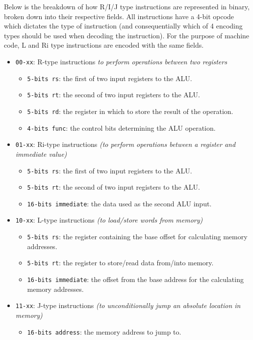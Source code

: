 \label{sec:MachineCodeEncoding}

Below is the breakdown of how R/I/J type instructions are represented in binary, broken down into their respective fields. All instructions have a 4-bit opcode which dictates the type of instruction (and consequentially which of 4 encoding types should be used when decoding the instruction). For the purpose of machine code, L and Ri type instructions are encoded with the same fields.

\begin{itemize}
    \item \texttt{00-xx}: R-type instructions \textit{to perform operations between two registers}
        \begin{itemize}
            \item \texttt{5-bits rs}: the first of two input registers to the ALU.
            \item \texttt{5-bits rt}: the second of two input registers to the ALU.
            \item \texttt{5-bits rd}: the register in  which to store the result of the operation.
            \item \texttt{4-bits func}: the control bits determining the ALU operation.
        \end{itemize}
    \item \texttt{01-xx}: Ri-type instructions \textit{(to perform operations between a register and immediate value)}
        \begin{itemize}
            \item \texttt{5-bits rs}: the first of two input registers to the ALU.
            \item \texttt{5-bits rt}: the second of two input registers to the ALU.
            \item \texttt{16-bits immediate}: the data used as the second ALU input.
        \end{itemize}
    \item \texttt{10-xx}: L-type instructions \textit{(to load/store words from memory)}
        \begin{itemize}
            \item \texttt{5-bits rs}: the register containing the base offset for calculating memory addresses.
            \item \texttt{5-bits rt}: the register to store/read data from/into memory.
            \item \texttt{16-bits immediate}: the offset from the base address for the calculating memory addresses.
        \end{itemize}
    \item \texttt{11-xx}: J-type instructions \textit{(to unconditionally jump an absolute location in memory)}
        \begin{itemize}
            \item \texttt{16-bits address}: the memory address to jump to.
        \end{itemize}
\end{itemize}
 
